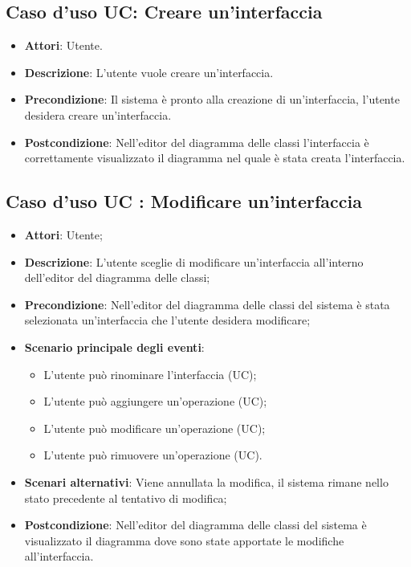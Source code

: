 \documentclass[../AnalisiDeiRequisiti.tex]{subfiles}
\begin{document}
		
		\subsection{Caso d'uso UC: Creare un'interfaccia}
		\begin{itemize}
			\item\textbf{Attori}: Utente.
			\item\textbf{Descrizione}: L'utente vuole creare un'interfaccia.
			\item\textbf{Precondizione}: Il sistema è pronto alla creazione di un'interfaccia, l'utente desidera creare un'interfaccia.
			\item\textbf{Postcondizione}: Nell'editor del diagramma delle classi l'interfaccia è correttamente visualizzato il diagramma nel quale è stata creata l'interfaccia.
		\end{itemize}
			
				
		\subsection{Caso d'uso UC : Modificare un'interfaccia}
			\begin{itemize}
				\item \textbf{Attori}: Utente;
				\item \textbf{Descrizione}: L'utente sceglie di modificare un'interfaccia
				all'interno dell'editor del diagramma delle classi;
				\item \textbf{Precondizione}: Nell'editor del diagramma delle classi del
				sistema è stata selezionata un'interfaccia che l'utente desidera modificare;
				\item \textbf{Scenario principale degli eventi}:
					\begin{itemize}
						\item L'utente può rinominare l'interfaccia (UC);
						\item L'utente può aggiungere un'operazione (UC);
						\item L'utente può modificare un'operazione (UC);
						\item L'utente può rimuovere un'operazione (UC).
					\end{itemize}
				\item \textbf{Scenari alternativi}: Viene annullata la modifica, il sistema
				rimane nello stato precedente al tentativo di modifica;
				\item \textbf{Postcondizione}: Nell'editor del diagramma delle classi del
				sistema è visualizzato il diagramma dove sono state apportate le modifiche
				all'interfaccia.
			\end{itemize}
\end{document}
